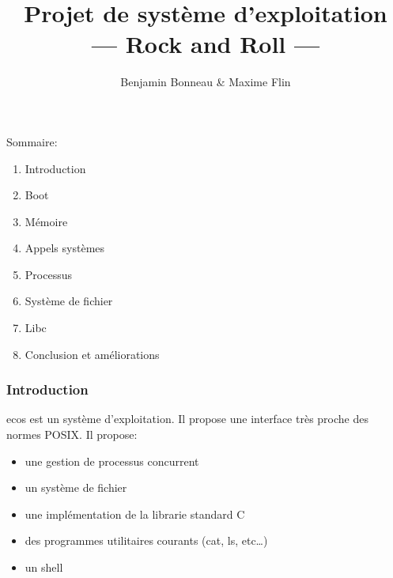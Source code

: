 \documentclass[10pt,a4paper]{beamer}
\author{Benjamin Bonneau \& Maxime Flin }
\title{Projet de système d'exploitation \\ --- Rock and Roll ---}
\begin{document}
\maketitle

\begin{frame}
  Sommaire:
  \begin{enumerate}
  \item Introduction
  \item Boot
  \item Mémoire
  \item Appels systèmes
  \item Processus
  \item Système de fichier
  \item Libc
  \item Conclusion et améliorations
  \end{enumerate}
\end{frame}

\begin{frame}
  \frametitle{Introduction}
  \textrm{ecos} est un système d'exploitation. Il propose une interface très proche des normes \textrm{POSIX}. Il propose:
  \begin{itemize}
  \item une gestion de processus concurrent
  \item un système de fichier
  \item une implémentation de la librarie standard C
  \item des programmes utilitaires courants (\textrm{cat}, \textrm{ls}, etc\ldots)
  \item un shell
  \end{itemize}
\end{frame}
\end{document}
